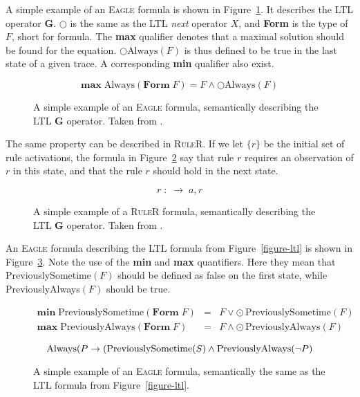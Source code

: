 A simple example of an \textsc{Eagle} formula is shown in
Figure~\ref{figure-eagle-always}.
It describes the LTL operator $\boldsymbol{G}$. $\bigcirc$ is the same as the
LTL \textit{next} operator $X$, and \textbf{Form} is the type of $F$, short for
formula. The \textbf{max} qualifier denotes that a maximal solution should be
found for the equation. $\bigcirc \text{Always}(F)$ is thus defined to be true
in the last state of a given trace. A corresponding \textbf{min} qualifier also
exist.

\begin{figure}[h!]
	\[
  \textbf{max} \; \text{Always}(\textbf{Form} \; F) = F \wedge \bigcirc \text{Always}(F)
	\]

  \caption{A simple example of an \textsc{Eagle} formula, semantically
    describing the LTL $\boldsymbol{G}$ operator. Taken from
    \cite{barringer03eagle}.}
	\label{figure-eagle-always}
\end{figure}

The same property can be described in \textsc{RuleR}. If we let $\{r\}$ be the
initial set of rule activations, the formula in
Figure~\ref{figure-ruler-always} say that rule $r$ requires an observation of
$r$ in this state, and that the rule $r$ should hold in the next state.

\begin{figure}[h!]
	\[
    r \; : \; \rightarrow \; a,r
	\]

	\caption{A simple example of a \textsc{RuleR} formula, semantically describing the
  LTL $\boldsymbol{G}$ operator. Taken from \cite{barringer07ruler}.}
	\label{figure-ruler-always}
\end{figure}

An \textsc{Eagle} formula describing the LTL formula from
Figure~\ref{figure-ltl} is shown in Figure~\ref{figure-eagle-ltl}. Note the use
of the \textbf{min} and \textbf{max} quantifiers. Here they mean that
PreviouslySometime$(F)$ should be defined as false on the first state, while
PreviouslyAlways$(F)$ should be true.


\begin{figure}[h!]
  \[
  \begin{array}{rcl}
    \textbf{min} \; \text{PreviouslySometime}(\textbf{Form} \; F) & = & F \vee \odot \, \text{PreviouslySometime}(F) \\
      \textbf{max} \; \text{PreviouslyAlways}(\textbf{Form} \; F) & = & F \wedge \odot \, \text{PreviouslyAlways}(F) \\
  \end{array}
  \]
  \[
    \text{Always}(P \rightarrow (\text{PreviouslySometime}(S) \wedge \text{PreviouslyAlways}(\neg P) \\
  \]

	\caption{A simple example of an \textsc{Eagle} formula, semantically the same as the
  LTL formula from Figure~\ref{figure-ltl}.}
	\label{figure-eagle-ltl}
\end{figure}

